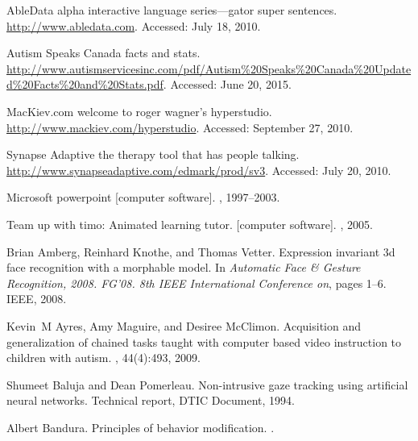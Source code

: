 \documentclass{ut-thesis}
\begin{document}

\begin{thebibliography}{100}

{AbleData} alpha interactive language series—gator super sentences.
\newblock \url{http://www.abledata.com}.
\newblock Accessed: July 18, 2010.

{Autism Speaks Canada} facts and stats.
\newblock
  \url{http://www.autismservicesinc.com/pdf/Autism%20Speaks%20Canada%20Updated%20Facts%20and%20Stats.pdf}.
\newblock Accessed: June 20, 2015.

{MacKiev.com} welcome to roger wagner’s hyperstudio.
\newblock \url{http://www.mackiev.com/hyperstudio}.
\newblock Accessed: September 27, 2010.

{Synapse Adaptive} the therapy tool that has people talking.
\newblock \url{http://www.synapseadaptive.com/edmark/prod/sv3}.
\newblock Accessed: July 20, 2010.

Microsoft powerpoint [computer software].
, 1997–2003.

Team up with timo: Animated learning tutor. [computer software].
, 2005.

Brian Amberg, Reinhard Knothe, and Thomas Vetter.
\newblock Expression invariant 3d face recognition with a morphable model.
\newblock In {\em Automatic Face \& Gesture Recognition, 2008. FG'08. 8th IEEE
  International Conference on}, pages 1--6. IEEE, 2008.

Kevin~M Ayres, Amy Maguire, and Desiree McClimon.
\newblock Acquisition and generalization of chained tasks taught with computer
  based video instruction to children with autism.
,
  44(4):493, 2009.

Shumeet Baluja and Dean Pomerleau.
\newblock Non-intrusive gaze tracking using artificial neural networks.
\newblock Technical report, DTIC Document, 1994.

Albert Bandura.
\newblock Principles of behavior modification.
.


\end{thebibliography}
\end{document}
